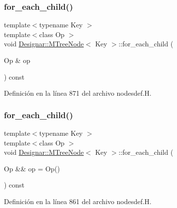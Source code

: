 \subsubsection{\texorpdfstring{for\+\_\+each\+\_\+child()}{for\_each\_child()}\hspace{0.1cm}{\footnotesize\ttfamily [1/2]}}
{\footnotesize\ttfamily template$<$typename Key $>$ \\
template$<$class Op $>$ \\
void \hyperlink{class_designar_1_1_m_tree_node}{Designar\+::\+M\+Tree\+Node}$<$ Key $>$\+::for\+\_\+each\+\_\+child (\begin{DoxyParamCaption}\item[{Op \&}]{op }\end{DoxyParamCaption}) const}



Definición en la línea 871 del archivo nodesdef.\+H.

\mbox{\label{class_designar_1_1_m_tree_node_a6cb0e3e0b246cd11dee5017a5058f0b1}} 
\subsubsection{\texorpdfstring{for\+\_\+each\+\_\+child()}{for\_each\_child()}\hspace{0.1cm}{\footnotesize\ttfamily [2/2]}}
{\footnotesize\ttfamily template$<$typename Key $>$ \\
template$<$class Op $>$ \\
void \hyperlink{class_designar_1_1_m_tree_node}{Designar\+::\+M\+Tree\+Node}$<$ Key $>$\+::for\+\_\+each\+\_\+child (\begin{DoxyParamCaption}\item[{Op \&\&}]{op = {\ttfamily Op()} }\end{DoxyParamCaption}) const\hspace{0.3cm}{\ttfamily [inline]}}



Definición en la línea 861 del archivo nodesdef.\+H.

\mbox{\label{class_designar_1_1_m_tree_node_a4e9b81f97d9f471a44e4fb84b1bb224b}} 
